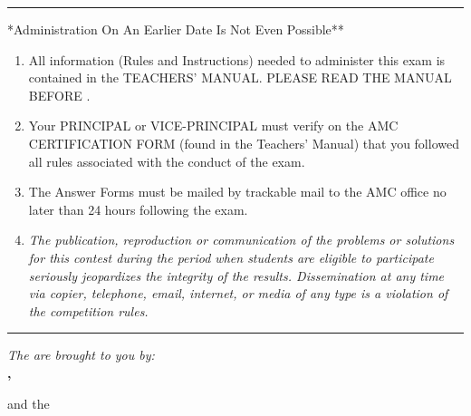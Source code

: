 \newcommand{\testNumAfter}{\test{\testNum}}

\begin{center}
\fosfamily{}\selectfont
{}
\rule{\linewidth}{0.2cm}
\LARGE **Administration On An Earlier Date Is Not Even Possible**
\end{center}
\vspace*{5mm}
{
\selectfont
\normalfont
\begin{enumerate}
\item All information (Rules and Instructions) needed to administer this exam is contained in the TEACHERS' MANUAL. PLEASE READ THE MANUAL BEFORE \uppercase{\duedate}.
\item  Your PRINCIPAL or VICE-PRINCIPAL must verify on the AMC {\tentwelve} CERTIFICATION FORM (found in the Teachers' Manual) that you followed all rules associated with the conduct of the exam.
\item The Answer Forms must be mailed by trackable mail to the AMC office no later than 24 hours following the exam.
\item \textit{The publication, reproduction or communication of the problems or solutions for this contest during the period when students are eligible to participate seriously jeopardizes the integrity of the results. Dissemination at any time via copier, telephone, email, internet, or media of any type is a violation of the competition rules.}
\end{enumerate}
}

\vspace{4mm}
\begin{center}
\rule{\linewidth}{0.1mm}
\end{center}

\begin{center}
\textit{The {\bfseries\mockName} are brought to you by:}\\[1\baselineskip]
{\bfseries \committee,}
 
 and the {\committeeName}
\end{center}

